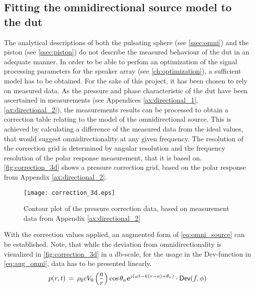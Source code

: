 \subsection{Fitting the omnidirectional source model to the \gls{dut}}\label{sec:correction}
The analytical descriptions of both the pulsating sphere (see \autoref{ssec:omni}) and the piston (see \autoref{ssec:piston}) do not describe the measured behaviour of the \gls{dut} in an adequate manner. In order to be able to perfom an optimization of the signal processing parameters for the speaker array (see \autoref{ch:optimization}), a sufficient model has to be obtained. For the sake of this project, it has been chosen to rely on measured data.
As the pressure and phase characteristic of the \gls{dut} have been ascertained in measurements (see Appendices \ref{ax:directional_1},\ref{ax:directional_2}), the measurements results can be processed to obtain a correction table relating to the model of the omnidirectional source. This is achieved by calculating a difference of the measured data from the ideal values, that would suggest omnidirectionality at any given frequency. The resolution of the correction grid is determined by angular resolution and the frequency resolution of the polar response measurement, that it is based on.  \autoref{fig:correction_3d} shows a pressure correction grid, based on the polar response from Appendix \ref{ax:directional_2}.
\begin{figure}[H]
	\centering
	\texttt{[image: correction\_3d.eps]}
	\caption{Contour plot of the pressure correction data, based on measurement data from Appendix \ref{ax:directional_2}}
		\label{fig:correction_3d}
\end{figure}
With the correction values applied, an augmented form of \autoref{eq:omni_source} can be established. Note, that while the deviation from omnidirectionality is visualized in \autoref{fig:correction_3d} in a \si{\decibel}-scale, for the usage in the \textsf{Dev}-function in \autoref{eq:aug_omni}, data has to be presented linearly.
\begin{equation}\label{eq:aug_omni}
p(r,t)\,=\,\rho_0 c V_0 \left(\frac{a}{r}\right)\cos \theta_a \textbf{\textit{e}}^{j\left(\omega t - k(r-a)+\theta_a\right)}\cdot\textsf{Dev}(f,\phi)
\end{equation}
\startexplain
{}
\stopexplain
